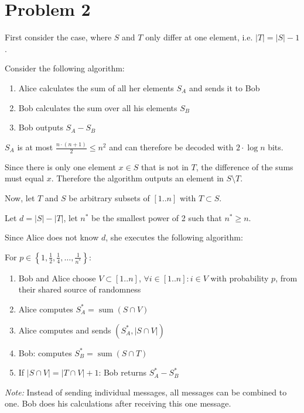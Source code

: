 \section*{Problem 2}

First consider the case, where $S$ and $T$ only differ at one element, i.e. $|T| = |S| - 1$.

Consider the following algorithm: 

\begin{enumerate}
    \item Alice calculates the sum of all her elements $S_A$ and sends it to Bob
    \item Bob calculates the sum over all his elements $S_B$
    \item Bob outputs $S_A - S_B$
\end{enumerate}

$S_A$ is at most $\frac{n \cdot (n + 1)}{2} \leq n^2$ and can therefore be decoded with $2\cdot\log n$ bits. 

Since there is only one element $x \in S$ that is not in $T$, the difference of the sums must equal $x$. Therefore the algorithm outputs an element in $S\setminus T$.

Now, let $T$ and $S$ be arbitrary subsets of $[1..n]$ with $T \subset S$. 

Let $d = |S| - |T|$, let $n^*$ be the smallest power of 2 such that $n^* \geq n$.

Since Alice does not know $d$, she executes the following algorithm:

For $p \in \left\{1, \frac{1}{2}, \frac{1}{4}, \dots, \frac{1}{n^*}\right\}$:

\begin{enumerate}
    \item Bob and Alice choose $V \subset [1..n]$, $\forall i \in [1..n]: i \in V$ with probability $p$, from their shared source of randomness
    \item Alice computes $S_A^* = \operatorname{sum}(S \cap V)$
    \item Alice computes and sends $(S_A^*, |S \cap V|)$ 
    \item Bob: computes $S_B^* = \operatorname{sum}(S \cap T)$
    \item If $|S \cap V| = |T \cap V| + 1$: Bob returns $S_A^* - S_B^*$
\end{enumerate}

\textit{Note:} Instead of sending individual messages, all messages can be combined to one. Bob does his calculations after receiving this one message.

